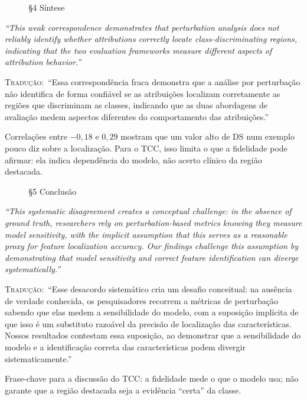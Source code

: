 \documentclass[11pt,a4paper]{article}
\newcommand{\pagechip}[1]{{\setlength{\fboxsep}{1.5pt}\colorbox{cAcc}{\textcolor{white}{\scriptsize\texttt{#1}}}}}
\newenvironment{origquote}{\par\itshape\small}{\par}
\newenvironment{tradquote}{\par\small\textsc{Tradução:}\ }{\par}
\newcommand{\explab}[1]{\par\smallskip{\small\color{cAcc}\textbf{\MakeUppercase{#1}}}\par}
\begin{document}
\begin{citacard}{\pagechip{p. 11} §4 Síntese}
\begin{origquote}“This weak correspondence demonstrates that perturbation analysis does not reliably identify whether attributions correctly locate class-discriminating regions, indicating that the two evaluation frameworks measure different aspects of attribution behavior.”\end{origquote}
\begin{tradquote}“Essa correspondência fraca demonstra que a análise por perturbação não identifica de forma confiável se as atribuições localizam corretamente as regiões que discriminam as classes, indicando que as duas abordagens de avaliação medem aspectos diferentes do comportamento das atribuições.”\end{tradquote}
\explab{Explicação}
Correlações entre $-0{,}18$ e $0{,}29$ mostram que um valor alto de DS num exemplo pouco diz sobre a localização. Para o TCC, isso limita o que a fidelidade pode afirmar: ela indica dependência do modelo, não acerto clínico da região destacada.
\end{citacard}

\begin{citacard}{\pagechip{p. 12} §5 Conclusão}
\begin{origquote}“This systematic disagreement creates a conceptual challenge: in the absence of ground truth, researchers rely on perturbation-based metrics knowing they measure model sensitivity, with the implicit assumption that this serves as a reasonable proxy for feature localization accuracy. Our findings challenge this assumption by demonstrating that model sensitivity and correct feature identification can diverge systematically.”\end{origquote}
\begin{tradquote}“Esse desacordo sistemático cria um desafio conceitual: na ausência de verdade conhecida, os pesquisadores recorrem a métricas de perturbação sabendo que elas medem a sensibilidade do modelo, com a suposição implícita de que isso é um substituto razoável da precisão de localização das características. Nossos resultados contestam essa suposição, ao demonstrar que a sensibilidade do modelo e a identificação correta das características podem divergir sistematicamente.”\end{tradquote}
\explab{Explicação}
Frase-chave para a discussão do TCC: a fidelidade mede o que o modelo usa; não garante que a região destacada seja a evidência “certa” da classe.
\end{citacard}
\end{document}
